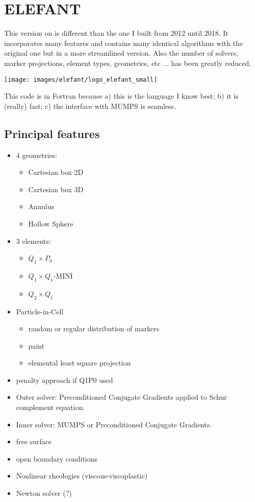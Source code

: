 \chapter{ELEFANT} %

This version on \elefant is different than the one I built from 2012 until 2018.
It incorporates many features and contains many identical algorithms with the original 
one but in a more streamlined version. Also the number of solvers, marker projections, 
element types, geometries, etc ... has been greatly reduced. 

\begin{center}
\texttt{[image: images/elefant/logo\_elefant\_small]}
\end{center}

This code is in Fortran because a) this is the language I know best; b) it is (really) fast;
c) the interface with MUMPS is seamless.  

\section{Principal features}

\begin{itemize}
\item 4 geometries:
\begin{itemize}
\item Cartesian box 2D
\item Cartesian box 3D
\item Annulus
\item Hollow Sphere
\end{itemize}
\item 3 elements:
\begin{itemize}
\item $Q_1\times P_0$
\item $Q_1\times Q_1$-MINI
\item $Q_2\times Q_1$
\end{itemize}
\item Particle-in-Cell
\begin{itemize}
\item random or regular distribution of markers
\item paint  
\item elemental least square projection
\end{itemize}
\item penalty approach if Q1P0 used
\item Outer solver: Preconditioned Conjugate Gradients applied to Schur complement equation.
\item Inner solver: MUMPS or Preconditioned Conjugate Gradients.
\item free surface
\item open boundary conditions
\item Nonlinear rheologies (viscous-viscoplastic)
\item Newton solver (?)
\end{itemize}

